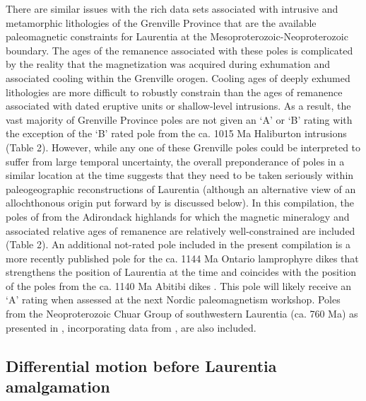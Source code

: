 \documentclass[twocolumn, switch]{article} %
\begin{document}
There are similar issues with the rich data sets associated with intrusive and metamorphic lithologies of the Grenville Province that are the available paleomagnetic constraints for Laurentia at the Mesoproterozoic-Neoproterozoic boundary. The ages of the remanence associated with these poles is complicated by the reality that the magnetization was acquired during exhumation and associated cooling within the Grenville orogen. Cooling ages of deeply exhumed lithologies are more difficult to robustly constrain than the ages of remanence associated with dated eruptive units or shallow-level intrusions. As a result, the vast majority of Grenville Province poles are not given an `A' or `B' rating with the exception of the `B' rated pole from the ca. 1015 Ma Haliburton intrusions (Table 2). However, while any one of these Grenville poles could be interpreted to suffer from large temporal uncertainty, the overall preponderance of poles in a similar location at the time suggests that they need to be taken seriously within paleogeographic reconstructions of Laurentia (although an alternative view of an allochthonous origin put forward by \citealp{Halls2015a} is discussed below). In this compilation, the poles of \cite{Brown2012a} from the Adirondack highlands for which the magnetic mineralogy and associated relative ages of remanence are relatively well-constrained are included (Table 2). An additional not-rated pole included in the present compilation is a more recently published pole for the ca. 1144 Ma Ontario lamprophyre dikes \citep{Piispa2018a} that strengthens the position of Laurentia at the time and coincides with the position of the poles from the ca. 1140 Ma Abitibi dikes \citep{Ernst1993a}. This pole will likely receive an `A' rating when assessed at the next Nordic paleomagnetism workshop. Poles from the Neoproterozoic Chuar Group of southwestern Laurentia (ca. 760 Ma)  as presented in \cite{Eyster2020a}, incorporating data from \cite{Weil2004a}, are also included. 

\subsection{Differential motion before Laurentia amalgamation}
\end{document}

